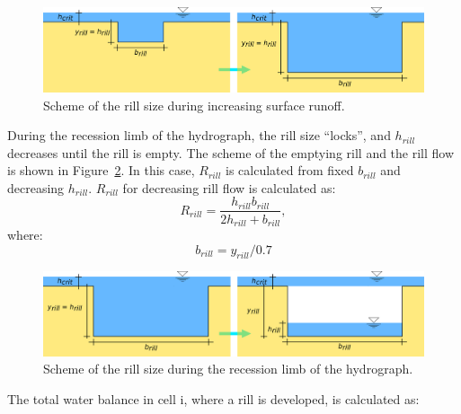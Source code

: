             \begin{figure}[b]
                \centering
                \includegraphics[width=1\linewidth]{./img/rill_schema_plneni.png}
                \caption{Scheme of the rill size during increasing surface runoff.}
                \label{fig:rill_plneni}
            \end{figure}


            During the recession limb of the hydrograph, the rill size “locks”, and
            $h_{rill}$ decreases until the rill is empty. The scheme of the emptying rill
            and the rill flow is shown in Figure~\ref{fig:rill_prazdneni}. In this case,
            $R_{rill}$ is calculated from fixed $b_{rill}$ and decreasing $h_{rill}$.
            $R_{rill}$ for decreasing rill flow is calculated as:
            \begin{equation}
                R_{rill} = \frac{h_{rill}b_{rill}}{2h_{rill}+b_{rill}},
              \label{eq:rrill2}
            \end{equation}
            where:
            \begin{equation}
              b_{rill} = y_{rill}/0.7
              \label{eq:brill2}
            \end{equation}

            \begin{figure}[t]
                \includegraphics[width=1\linewidth]{./img/rill_schema_prazdneni.png}
                \caption{Scheme of the rill size during the recession limb of the hydrograph.}
                \label{fig:rill_prazdneni}
            \end{figure}

            The total water balance in cell i, where a rill is developed, is calculated as:

